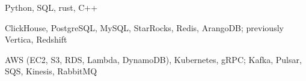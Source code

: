 
\begin{bullets}
    \item {}Python, SQL, rust, C++
    \item {}ClickHouse, PostgreSQL, MySQL, StarRocks, Redis, ArangoDB; previously Vertica, Redshift
    \item {}AWS (EC2, S3, RDS, Lambda, DynamoDB), Kubernetes, gRPC; Kafka, Pulsar, SQS, Kinesis, RabbitMQ
\end{bullets}
